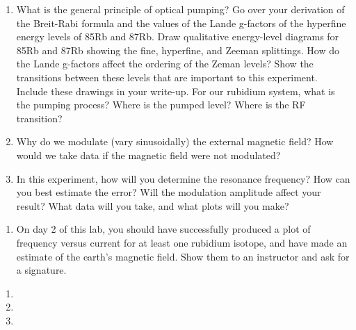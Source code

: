 \documentclass{../signatures}
\begin{document}
\maketitle

\names

\prelab

\begin{enumerate}

    \item What is the general principle of optical pumping? Go over your derivation of the Breit-Rabi formula and the values of the Lande g-factors of the hyperfine energy levels of 85Rb and 87Rb. Draw qualitative energy-level diagrams for 85Rb and 87Rb showing the fine, hyperfine, and Zeeman splittings. How do the Lande g-factors affect the ordering of the Zeman levels? Show the transitions between these levels that are important to this experiment. Include these drawings in your write-up. For our rubidium system, what is the pumping process? Where is the pumped level? Where is the RF transition?
    
    \item Why do we modulate (vary sinusoidally) the external magnetic field? How would we take data if the magnetic field were not modulated?

    \item In this experiment, how will you determine the resonance frequency? How can you best estimate the error? Will the modulation amplitude affect your result? What data will you take, and what plots will you make?
       \\[36pt]
\end{enumerate}

\prelabsignatures

\midlab

\begin{enumerate}

    \item On day 2 of this lab, you should have successfully produced a plot of frequency versus current for at least one rubidium isotope, and have made an estimate of the earth’s magnetic field. Show them to an instructor and ask for a signature.
\\[36pt]
\end{enumerate}


\checkpointsection 

\begin{enumerate}

\item {}

\item {}

\item {}

\end{enumerate}
\end{document}
